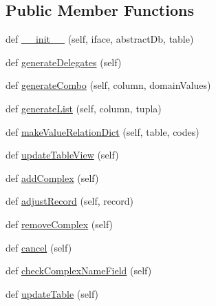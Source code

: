 \subsection*{Public Member Functions}
\begin{DoxyCompactItemize}
\item 
def \mbox{\hyperlink{class_dsg_tools_1_1_complex_tools_1_1manage_complex_1_1_manage_complex_dialog_a50b42ae19f98e4132c397b96dd580b1e}{\+\_\+\+\_\+init\+\_\+\+\_\+}} (self, iface, abstract\+Db, table)
\item 
def \mbox{\hyperlink{class_dsg_tools_1_1_complex_tools_1_1manage_complex_1_1_manage_complex_dialog_ad00be17c75aa87dc7a60d00ffec6f2df}{generate\+Delegates}} (self)
\item 
def \mbox{\hyperlink{class_dsg_tools_1_1_complex_tools_1_1manage_complex_1_1_manage_complex_dialog_aac3390863edf9ad88887aa65e640c445}{generate\+Combo}} (self, column, domain\+Values)
\item 
def \mbox{\hyperlink{class_dsg_tools_1_1_complex_tools_1_1manage_complex_1_1_manage_complex_dialog_a2fddbb8b09feb6e440397a333066d0fd}{generate\+List}} (self, column, tupla)
\item 
def \mbox{\hyperlink{class_dsg_tools_1_1_complex_tools_1_1manage_complex_1_1_manage_complex_dialog_ad7cddc5c0c4e2588da86d65c5baee3ee}{make\+Value\+Relation\+Dict}} (self, table, codes)
\item 
def \mbox{\hyperlink{class_dsg_tools_1_1_complex_tools_1_1manage_complex_1_1_manage_complex_dialog_afe2e6fe71eeb7263f7526ec50014edb4}{update\+Table\+View}} (self)
\item 
def \mbox{\hyperlink{class_dsg_tools_1_1_complex_tools_1_1manage_complex_1_1_manage_complex_dialog_a699449c936f5f42b3386bda4dd56f89c}{add\+Complex}} (self)
\item 
def \mbox{\hyperlink{class_dsg_tools_1_1_complex_tools_1_1manage_complex_1_1_manage_complex_dialog_a536d61fb7b1a56116abdc3dd21d15924}{adjust\+Record}} (self, record)
\item 
def \mbox{\hyperlink{class_dsg_tools_1_1_complex_tools_1_1manage_complex_1_1_manage_complex_dialog_af4f067c0ad67781741a72f58d7732469}{remove\+Complex}} (self)
\item 
def \mbox{\hyperlink{class_dsg_tools_1_1_complex_tools_1_1manage_complex_1_1_manage_complex_dialog_a36d847297beea2c4cea85bcf0c4b6c90}{cancel}} (self)
\item 
def \mbox{\hyperlink{class_dsg_tools_1_1_complex_tools_1_1manage_complex_1_1_manage_complex_dialog_a328662e0ada620af3647acdc87a7b111}{check\+Complex\+Name\+Field}} (self)
\item 
def \mbox{\hyperlink{class_dsg_tools_1_1_complex_tools_1_1manage_complex_1_1_manage_complex_dialog_aca5f214b97781c877690fadcd7bece00}{update\+Table}} (self)
\end{DoxyCompactItemize}
